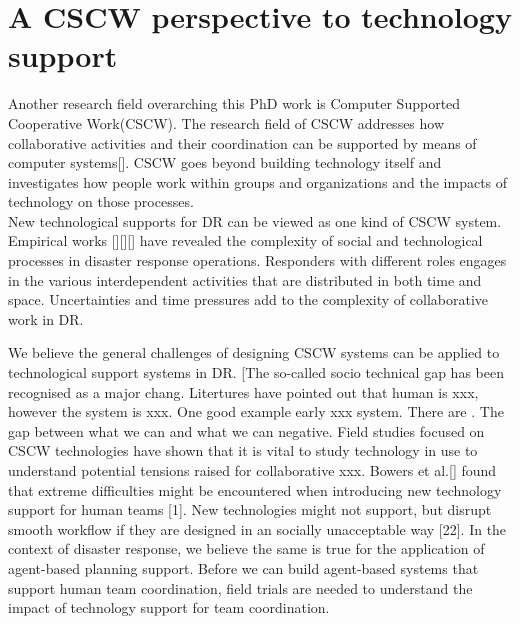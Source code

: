 \section{A CSCW perspective to technology support}
Another research field overarching this PhD work is  Computer Supported Cooperative Work(CSCW). The research field of CSCW addresses how collaborative activities and their coordination can be supported by means of computer systems[].  CSCW goes beyond building technology itself and investigates how people work within groups and organizations and the impacts of technology on those processes. \\

New technological supports for DR can be viewed as one kind of CSCW system. Empirical works [][][] have revealed the complexity of social and technological processes in disaster response operations. Responders with different roles engages in the various interdependent activities that are distributed in both time and space. Uncertainties and time pressures add to the complexity of collaborative work in DR. 

We believe the general challenges of designing CSCW systems can be applied to technological support systems in DR. [The so-called socio technical gap has been recognised as a major chang. Litertures have pointed out that human is xxx, however the system is xxx. One good example early xxx system. There are . The gap between what we can and what we can negative. Field studies focused on CSCW technologies have shown that it is vital to study technology in use to understand potential tensions raised for collaborative  xxx. Bowers et al.[] found that extreme difficulties might be encountered when introducing new technology support for human teams [1]. New technologies might not support, but disrupt smooth workflow if they are designed in an socially unacceptable way [22].  In the context of disaster response, we believe the same is true for the application of agent-based planning support. Before we can build agent-based systems that support human team coordination, field trials are needed to understand the impact of technology support for team coordination. \\ 


